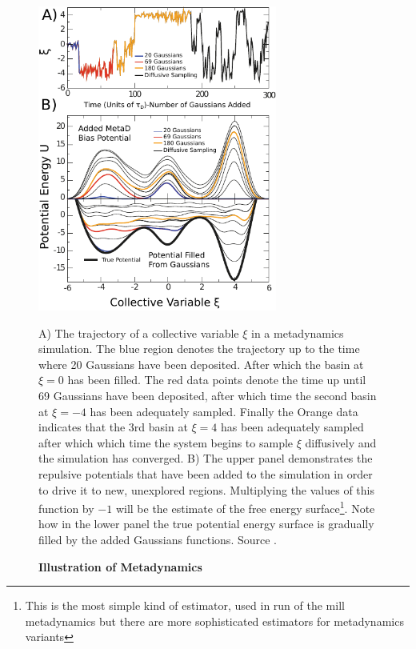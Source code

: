 \begin{figure}
	\begin{center}
		\includegraphics[width=0.7\textwidth]{figures/METAD_demonstration.pdf}
	\end{center}
	\captionsetup{singlelinecheck = false, justification=raggedright}
\caption[Illustration of Metadynamics] {\textbf{Illustration of Metadynamics}}{A) The trajectory of a collective variable $\xi$ in a  metadynamics simulation. The blue region denotes the trajectory up to the time where 20 Gaussians have been deposited. After which the basin at $\xi=0$ has been filled. The red data points denote the time up until 69 Gaussians have been deposited, after which time the second basin at $\xi=-4$ has been adequately sampled. Finally the Orange data indicates that the 3rd basin at $\xi=4$ has been adequately sampled after which which time the system begins to sample $\xi$ diffusively and the simulation has converged. B) The upper panel demonstrates the repulsive potentials that have been added to the simulation in order to drive it to new, unexplored regions. Multiplying the values of this function by $-1$ will be the estimate of the free energy surface\footnote{This is the most simple kind of estimator, used in run of the mill metadynamics but there are more sophisticated estimators for metadynamics variants}. Note how in the lower panel the true potential energy surface is gradually filled by the added Gaussians functions.  Source \cite{bussi2020}}.
	\label{METAD_demonstration}
\end{figure}

